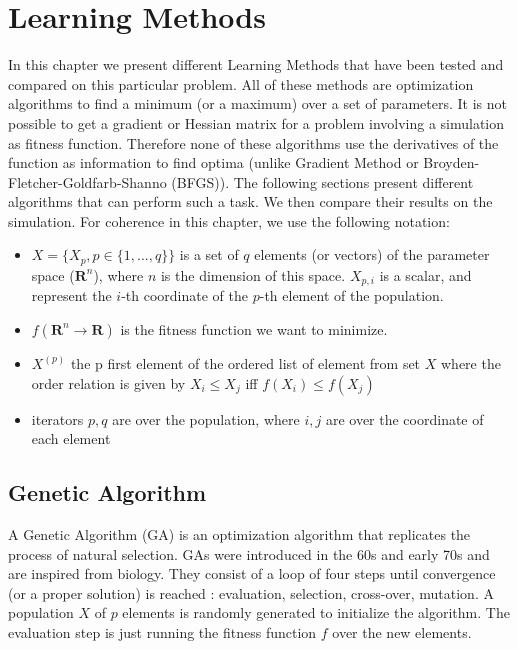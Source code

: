 
\chapter{Learning Methods} %

\label{Chapter 4} %


In this chapter we present different Learning Methods that have been tested and compared on this particular problem. All of these methods are optimization algorithms to find a minimum (or a maximum) over a set of parameters. It is not possible to get a gradient or Hessian matrix for a problem involving a simulation as fitness function. Therefore none of these algorithms use the derivatives of the function as information to find optima (unlike Gradient Method or Broyden-Fletcher-Goldfarb-Shanno (BFGS)). The following sections present different algorithms that can perform such a task. We then compare their results on the simulation. For coherence in this chapter, we use the following notation: 

\begin{itemize}
    \item $X = \{ X_p, p\in{\{1, ..., q\}}\} $ is a set of $q$ elements (or vectors) of the parameter space ($\mathbf{R}^ n $), where $n$ is the dimension of this space. $X_{p,i}$ is a scalar, and represent the $i$-th coordinate of the $p$-th element of the population.
    \item $f (\mathbf{R} ^ n \to \mathbf{R})$ is the fitness function we want to minimize.
    \item $X^{(p)}$ the p first element of the ordered list of element from set $X$ where the order relation is given by $X_i \leq X_j$ iff $f(X_i) \leq f(X_j)$
    \item iterators $p, q$ are over the population, where $i, j$ are over the coordinate of each element  
\end{itemize}

\section{Genetic Algorithm}

A Genetic Algorithm (GA) is an optimization algorithm that replicates the process of natural selection. GAs were introduced in the 60s and early 70s and are inspired from biology. They consist of a loop of four steps until convergence (or a proper solution) is reached : evaluation, selection, cross-over, mutation. A population $X$ of $p$ elements is randomly generated to initialize the algorithm. The evaluation step is just running the fitness function $f$ over the new elements.

